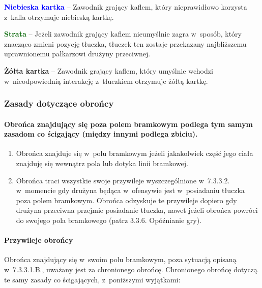 \documentclass[12pt,a4paper]{article}
\newcommand\yellowcard[1]{\bgroup\textcolor{darkyellow}{\textbf{#1}}}
\newcommand\bluecard[1]{\bgroup\textcolor{blue}{\textbf{#1}}}
\newcommand\other[1]{\bgroup\textcolor{darkgreen}{\textbf{#1}}}
\begin{document}
\bluecard{Niebieska kartka} -- Zawodnik grający kaflem, który nieprawidłowo
korzysta z~kafla otrzymuje niebieską kartkę.

\other{Strata} -- Jeżeli zawodnik grający kaflem nieumyślnie zagra w~sposób, który znacząco zmieni pozycję tłuczka, tłuczek ten zostaje
przekazany najbliższemu uprawnionemu pałkarzowi drużyny przeciwnej.

\yellowcard{Żółta kartka} -- Zawodnik grający kaflem, który umyślnie wchodzi w~nieodpowiednią interakcję z~tłuczkiem otrzymuje żółtą kartkę.

\subsubsection{Zasady dotyczące obrońcy}

\paragraph{Obrońca znajdujący się poza polem bramkowym podlega
	tym samym zasadom co ścigający (między innymi podlega zbiciu).}

\begin{enumerate}
	\item
	      Obrońca znajduje się w~polu bramkowym jeżeli jakakolwiek część jego
	      ciała znajduję się wewnątrz pola lub dotyka linii bramkowej.
	\item
	      Obrońca traci wszystkie swoje przywileje wyszczególnione w~7.3.3.2. w~momencie gdy drużyna będąca w~ofensywie jest w~posiadaniu tłuczka
	      poza polem bramkowym. Obrońca odzyskuje te przywileje dopiero gdy
	      drużyna przeciwna przejmie posiadanie tłuczka, nawet jeżeli obrońca
	      powróci do swojego pola bramkowego (patrz 3.3.6. Opóźnianie gry).
\end{enumerate}

\paragraph{Przywileje obrońcy}
Obrońca znajdujący się w~swoim
polu bramkowym, poza sytuacją opisaną w~7.3.3.1.B., uważany jest za
chronionego obrońcę. Chronionego obrońcę dotyczą te samy zasady co
ścigających, z~poniższymi wyjątkami:
\end{document}
